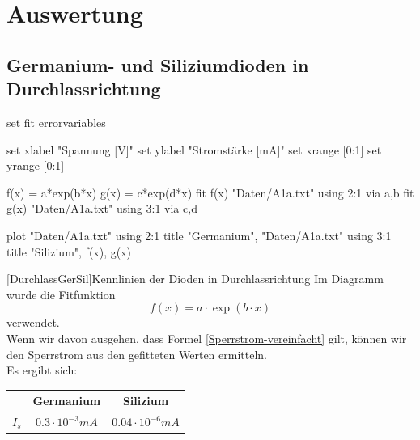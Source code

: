 \chapter{Auswertung}
    	\section{Germanium- und Siliziumdioden in Durchlassrichtung}
        	\begin{gnuplot}[terminal=pdf,terminaloptions={font ",10" linewidth 2},scale=1.2]
            		set fit errorvariables
					
                  	set xlabel "Spannung [V]"
                  	set ylabel "Stromstärke [mA]"
					set xrange [0:1]
                    set yrange [0:1]
                    
                    f(x) = a*exp(b*x)
                    g(x) = c*exp(d*x)
                    fit f(x) "Daten/A1a.txt" using 2:1 via a,b
                    fit g(x) "Daten/A1a.txt" using 3:1 via c,d
                    
                  	plot "Daten/A1a.txt" using 2:1 title "Germanium", "Daten/A1a.txt" using 3:1 title "Silizium", f(x), g(x)
			\end{gnuplot}
        [DurchlassGerSil]{Kennlinien der Dioden in Durchlassrichtung}
        Im Diagramm wurde die Fitfunktion 			
        \begin{equation}
        	f(x) = a \cdot \exp(b\cdot x)
        \end{equation}
        verwendet. \\
        
        Wenn wir davon ausgehen, dass Formel \ref{Sperrstrom-vereinfacht} gilt, können wir den Sperrstrom aus den gefitteten Werten ermitteln. \\
        
        Es ergibt sich:
	\begin{center}
		\begin{tabular}{c|cc}
			&  Germanium & Silizium\\ \hline
    		$I_s$ & $0.3\cdot 10^{-3} mA$ &  $0.04\cdot 10^{-6} mA$
		\end{tabular}
    \end{center}    
   		     
        
        \pagebreak
        

